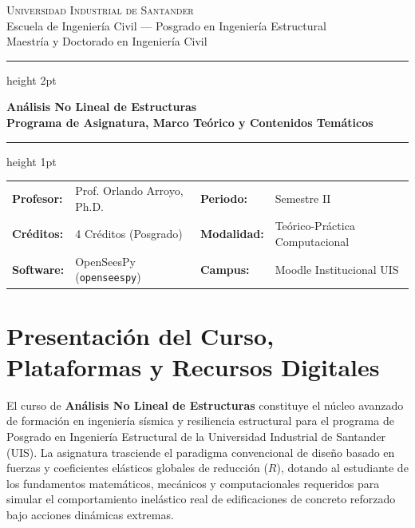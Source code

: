 \documentclass[11pt,letterpaper]{article}
\begin{document}
\begin{center}
    {\scshape\Large Universidad Industrial de Santander}\\[0.2cm]
    {\large Escuela de Ingeniería Civil --- Posgrado en Ingeniería Estructural}\\[0.15cm]
    {\normalsize Maestría y Doctorado en Ingeniería Civil}\\[0.35cm]
    {\color{uispurple}\hrule height 2pt}\vspace{0.4cm}
    
    {\Huge\bfseries\color{uisdark} Análisis No Lineal de Estructuras}\\[0.25cm]
    {\Large\bfseries\color{uispurple} Programa de Asignatura, Marco Teórico y Contenidos Temáticos}\\[0.3cm]
    
    {\color{uispurple}\hrule height 1pt}\vspace{0.35cm}
    
    \small
    \begin{tabularx}{\textwidth}{@{} l X l X @{}}
        \textbf{Profesor:} & Prof. Orlando Arroyo, Ph.D. & \textbf{Periodo:} & Semestre II \\
        \textbf{Créditos:} & 4 Créditos (Posgrado) & \textbf{Modalidad:} & Teórico-Práctica Computacional \\
        \textbf{Software:} & OpenSeesPy (\texttt{openseespy}) & \textbf{Campus:} & Moodle Institucional UIS
    \end{tabularx}
\end{center}

\vspace{0.3cm}

\section{Presentación del Curso, Plataformas y Recursos Digitales}

El curso de \textbf{Análisis No Lineal de Estructuras} constituye el núcleo avanzado de formación en ingeniería sísmica y resiliencia estructural para el programa de Posgrado en Ingeniería Estructural de la Universidad Industrial de Santander (UIS). La asignatura trasciende el paradigma convencional de diseño basado en fuerzas y coeficientes elásticos globales de reducción ($R$), dotando al estudiante de los fundamentos matemáticos, mecánicos y computacionales requeridos para simular el comportamiento inelástico real de edificaciones de concreto reforzado bajo acciones dinámicas extremas.
\end{document}
